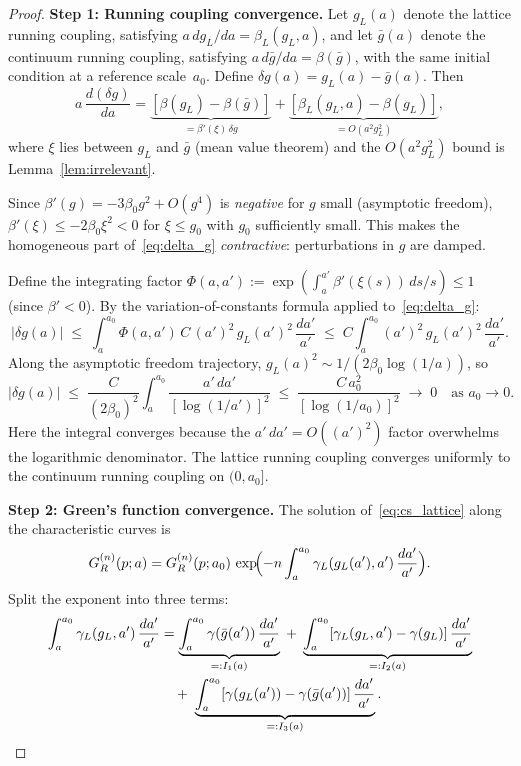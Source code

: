 \documentclass[11pt,a4paper]{article}
\theoremstyle{plain}
\theoremstyle{definition}
\theoremstyle{remark}
\begin{document}
\begin{proof}
\textbf{Step 1: Running coupling convergence.}
Let $g_L(a)$ denote the lattice running coupling,
satisfying $a\,dg_L/da = \beta_L(g_L, a)$, and let
$\bar{g}(a)$ denote the continuum running coupling,
satisfying $a\,d\bar{g}/da = \beta(\bar{g})$, with the
same initial condition at a reference scale~$a_0$.
Define $\delta g(a) = g_L(a) - \bar{g}(a)$.  Then
\begin{equation}\label{eq:delta_g}
  a\,\frac{d(\delta g)}{da}
  = \underbrace{[\beta(g_L) - \beta(\bar{g})]}_{
  = \beta'(\xi)\,\delta g}
  + \underbrace{[\beta_L(g_L, a) - \beta(g_L)]}_{
  = O(a^2 g_L^2)},
\end{equation}
where $\xi$ lies between $g_L$ and $\bar{g}$
(mean value theorem) and the $O(a^2 g_L^2)$ bound
is Lemma~\ref{lem:irrelevant}.

Since $\beta'(g) = -3\beta_0 g^2 + O(g^4)$
is \emph{negative} for $g$ small (asymptotic freedom),
$\beta'(\xi) \leq -2\beta_0 \xi^2 < 0$ for
$\xi \leq g_0$ with $g_0$ sufficiently small.
This makes the homogeneous part of~\eqref{eq:delta_g}
\emph{contractive}: perturbations in $g$ are damped.

Define the integrating factor
$\Phi(a, a') :=
\exp(\int_a^{a'} \beta'(\xi(s))\,ds/s) \leq 1$
(since $\beta' < 0$).  By the variation-of-constants
formula applied to~\eqref{eq:delta_g}:
\begin{equation}\label{eq:gronwall_bound}
  |\delta g(a)|
  \;\leq\; \int_a^{a_0} \Phi(a, a')\,
  C\,(a')^2\,g_L(a')^2\,\frac{da'}{a'}
  \;\leq\; C \int_a^{a_0}
  (a')^2\,g_L(a')^2\,\frac{da'}{a'}.
\end{equation}
Along the asymptotic freedom trajectory,
$g_L(a)^2 \sim 1/(2\beta_0\log(1/a))$, so
\begin{equation}
  |\delta g(a)|
  \;\leq\; \frac{C}{(2\beta_0)^2}
  \int_a^{a_0}
  \frac{a'\,da'}{[\log(1/a')]^2}
  \;\leq\; \frac{C\,a_0^2}{[\log(1/a_0)]^2}
  \;\to\; 0 \quad \text{as } a_0 \to 0.
\end{equation}
Here the integral converges because the
$a'\,da' = O((a')^2)$ factor overwhelms the
logarithmic denominator.  The lattice running
coupling converges uniformly to the continuum
running coupling on $(0, a_0]$.

\smallskip
\textbf{Step 2: Green's function convergence.}
The solution of~\eqref{eq:cs_lattice} along
the characteristic curves is
\begin{equation}\label{eq:cs_solution}
  G_R^{(n)}(p; a)
  = G_R^{(n)}(p; a_0)\,
  \exp\!\Bigl(-n\int_a^{a_0}
  \gamma_L(g_L(a'), a')\,\frac{da'}{a'}\Bigr).
\end{equation}
Split the exponent into three terms:
\begin{align}
  \int_a^{a_0} \gamma_L(g_L, a')\,\frac{da'}{a'}
  &= \underbrace{\int_a^{a_0}
  \gamma(\bar{g}(a'))\,\frac{da'}{a'}}_{=: I_1(a)}
  \;+\; \underbrace{\int_a^{a_0}
  [\gamma_L(g_L, a') - \gamma(g_L)]\,
  \frac{da'}{a'}}_{=: I_2(a)} \notag \\
  &\quad +\; \underbrace{\int_a^{a_0}
  [\gamma(g_L(a')) - \gamma(\bar{g}(a'))]\,
  \frac{da'}{a'}}_{=: I_3(a)}.
  \label{eq:exponent_split}
\end{align}


\end{proof}
\end{document}
